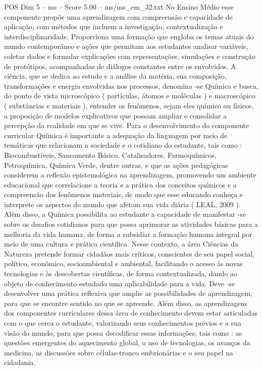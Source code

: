 \begin{textsample}{POS Dim 5 – ms – Score 5.00 – ms/ms\_em\_32.txt}
No Ensino Médio esse componente propõe uma aprendizagem com compreensão e capacidade de aplicação, com métodos que incluem a investigação, contextualização e interdisciplinaridade.
Proporciona uma formação que engloba os temas atuais do mundo contemporâneo e ações que permitam aos estudantes analisar variáveis, coletar dados e formular explicações com representações, simulações e construção de protótipos, acompanhadas de diálogos constantes entre os envolvidos.
A ciência, que se dedica ao estudo e a análise da matéria, sua composição, transformações e energia envolvidas nos processos, denomina -se Química e busca, do ponto de vista microscópico ( partículas, átomos e moléculas ) e macroscópico ( substâncias e materiais ), entender os fenômenos, sejam eles químico ou físicos, a proposição de modelos explicativos que possam ampliar e consolidar a percepção da realidade em que se vive.
Para o desenvolvimento do componente curricular Química é importante a adequação da linguagem por meio de temáticas que relacionam a sociedade e o cotidiano do estudante, tais como : Biocombustíveis, Saneamento Básico, Catalisadores, Farmoquímicos, Petroquímica, Química Verde, dentre outras, e que as ações pedagógicas considerem a reflexão epistemológica na aprendizagem, promovendo um ambiente educacional que correlacione a teoria e a prática dos conceitos químicos e a compreensão dos fenômenos materiais, de modo que esse educando conheça e interprete os aspectos do mundo que afetam sua vida diária ( LEAL, 2009 ).
Além disso, a Química possibilita ao estudante a capacidade de manifestar -se sobre os desafios cotidianos para que possa aprimorar as atividades básicas para a melhoria da vida humana, de forma a subsidiar a formação humana integral por meio de uma cultura e prática científica.
Nesse contexto, a área Ciências da Natureza pretende formar cidadãos mais críticos, conscientes de seu papel social, político, econômico, socioambiental e ambiental, facilitando o acesso às novas tecnologias e às descobertas científicas, de forma contextualizada, dando ao objeto de conhecimento estudado uma aplicabilidade para a vida.
Deve -se desenvolver uma prática reflexiva que amplie as possibilidades de aprendizagem, para que se encontre sentido no que se apreende.
Além disso, as aprendizagens dos componentes curriculares dessa área de conhecimento devem estar articuladas com o que cerca o estudante, valorizando seus conhecimentos prévios e a sua visão do mundo, para que possa decodificar essas informações, tais como : as questões emergentes do aquecimento global, o uso de tecnologias, os avanços da medicina, as discussões sobre células-tronco embrionárias e o seu papel na cidadania.

\end{textsample}
